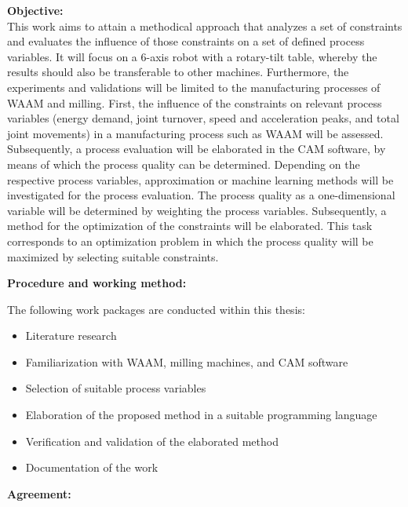\vspace{5mm}
\textbf{Objective:}\\
This work aims to attain a methodical approach that analyzes a set of constraints and 
evaluates the influence of those constraints on a set of defined process variables. It will focus
on a 6-axis robot with a rotary-tilt table, whereby the results should also be transferable to other machines. Furthermore, the experiments and validations will be limited to the 
manufacturing processes of \acrshort{WAAM} and milling.
First, the influence of the constraints on relevant process variables (energy demand, joint 
turnover, speed and acceleration peaks, and total joint movements) in a manufacturing 
process such as \acrshort{WAAM} will be assessed. Subsequently, a process evaluation will be
elaborated in the \acrshort{CAM} software, by means of which the process quality can be determined.
Depending on the respective process variables, approximation or machine learning methods 
will be investigated for the process evaluation. The process quality as a one-dimensional 
variable will be determined by weighting the process variables. Subsequently, a method for 
the optimization of the constraints will be elaborated. This task corresponds to an optimization 
problem in which the process quality will be maximized by selecting suitable constraints.\newline


\vspace{5mm}
\textbf{Procedure and working method:}\newline

The following work packages are conducted within this thesis:

\begin{itemize}
\item Literature research
\item Familiarization with \acrshort{WAAM}, milling machines, and \acrshort{CAM} software
\item Selection of suitable process variables
\item Elaboration of the proposed method in a suitable programming language
\item Verification and validation of the elaborated method
\item Documentation of the work

\newpage	 
\end{itemize}
\vspace{1.0cm}
\textbf{Agreement:}\\

